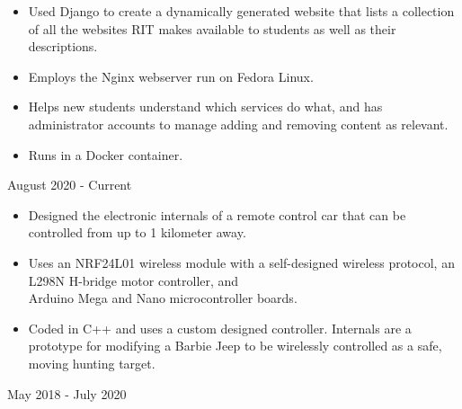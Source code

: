 \documentclass[11pt,letterpaper,ragged2e]{altacv}
\begin{document}

\begin{fullwidth}
\makecvheader
\end{fullwidth}



{
\begin{itemize}
    \item Used Django to create a dynamically generated website that lists a collection of all the websites RIT makes available to students as well as their descriptions.
    \item Employs the Nginx webserver run on Fedora Linux.
    \item Helps new students understand which services do what, and has administrator accounts to manage adding and removing content as relevant.
    \item Runs in a Docker container.
\end{itemize}
}
{August 2020 - Current}


{
\begin{itemize}
    \item Designed the electronic internals of a remote control car that can be controlled from up to 1 kilometer away.
    \item Uses an NRF24L01 wireless module with a self-designed wireless protocol, an L298N H-bridge motor controller, and \\ Arduino Mega and Nano microcontroller boards.
    \item Coded in C++ and uses a custom designed controller. Internals are a prototype for modifying a Barbie Jeep to be wirelessly controlled as a safe, moving hunting target.
\end{itemize}
}
{May 2018 - July 2020}
\end{document}
